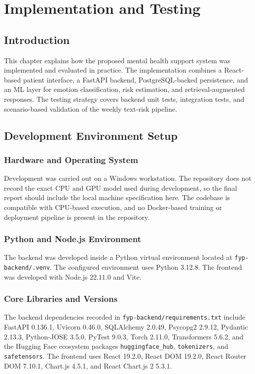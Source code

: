 \chapter{Implementation and Testing}

\section{Introduction}

This chapter explains how the proposed mental health support system was implemented and evaluated in practice. The implementation combines a React-based patient interface, a FastAPI backend, PostgreSQL-backed persistence, and an ML layer for emotion classification, risk estimation, and retrieval-augmented responses. The testing strategy covers backend unit tests, integration tests, and scenario-based validation of the weekly text-risk pipeline.

\section{Development Environment Setup}

\subsection{Hardware and Operating System}

Development was carried out on a Windows workstation. The repository does not record the exact CPU and GPU model used during development, so the final report should include the local machine specification here. The codebase is compatible with CPU-based execution, and no Docker-based training or deployment pipeline is present in the repository.

\subsection{Python and Node.js Environment}

The backend was developed inside a Python virtual environment located at \texttt{fyp-backend/.venv}. The configured environment uses Python 3.12.8. The frontend was developed with Node.js 22.11.0 and Vite.

\subsection{Core Libraries and Versions}

The backend dependencies recorded in \texttt{fyp-backend/requirements.txt} include FastAPI 0.136.1, Uvicorn 0.46.0, SQLAlchemy 2.0.49, Psycopg2 2.9.12, Pydantic 2.13.3, Python-JOSE 3.5.0, PyTest 9.0.3, Torch 2.11.0, Transformers 5.6.2, and the Hugging Face ecosystem packages \texttt{huggingface\_hub}, \texttt{tokenizers}, and \texttt{safetensors}. The frontend uses React 19.2.0, React DOM 19.2.0, React Router DOM 7.10.1, Chart.js 4.5.1, and React Chart.js 2 5.3.1.


